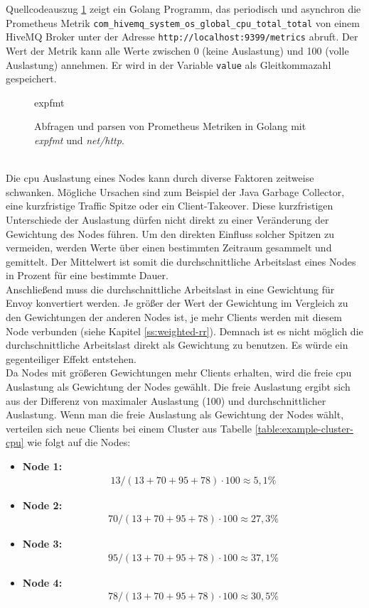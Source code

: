 Quellcodeauszug \ref{code:expfmt} zeigt ein Golang Programm, das periodisch und asynchron die Prometheus Metrik \verb|com_hivemq_system_os_global_cpu_total_total| von einem HiveMQ Broker unter der Adresse \verb|http://localhost:9399/metrics| abruft. Der Wert der Metrik kann alle Werte zwischen 0 (keine Auslastung) und 100 (volle Auslastung) annehmen. Er wird in der Variable \verb|value| als Gleitkommazahl gespeichert.
\begin{figure}
    {expfmt}
    \caption{Abfragen und parsen von Prometheus Metriken in Golang mit \textit{expfmt} und \textit{net/http}.}
    \label{code:expfmt}
\end{figure}
\\
Die \ac{cpu} Auslastung eines Nodes kann durch diverse Faktoren zeitweise schwanken. Mögliche Ursachen sind zum Beispiel der Java Garbage Collector, eine kurzfristige Traffic Spitze oder ein Client-Takeover.
Diese kurzfristigen Unterschiede der Auslastung dürfen nicht direkt zu einer Veränderung der Gewichtung des Nodes führen.
Um den direkten Einfluss solcher Spitzen zu vermeiden, werden Werte über einen bestimmten Zeitraum gesammelt und gemittelt. Der Mittelwert ist somit die durchschnittliche Arbeitslast eines Nodes in Prozent für eine bestimmte Dauer.
\\
Anschlie{\ss}end muss die durchschnittliche Arbeitslast in eine Gewichtung für Envoy konvertiert werden. Je grö{\ss}er der Wert der Gewichtung im Vergleich zu den Gewichtungen der anderen Nodes ist, je mehr Clients werden mit diesem Node verbunden (siehe Kapitel \ref{ss:weighted-rr}). Demnach ist es nicht möglich die durchschnittliche Arbeitslast direkt als Gewichtung zu benutzen. Es würde ein gegenteiliger Effekt entstehen.
\\
Da Nodes mit grö{\ss}eren Gewichtungen mehr Clients erhalten, wird die freie \ac{cpu} Auslastung als Gewichtung der Nodes gewählt.
Die freie Auslastung ergibt sich aus der Differenz von maximaler Auslastung (100) und durchschnittlicher Auslastung.
Wenn man die freie Auslastung als Gewichtung der Nodes wählt, verteilen sich neue Clients bei einem Cluster aus Tabelle \ref{table:example-cluster-cpu} wie folgt auf die Nodes:
\begin{itemize}
  \item \textbf{Node 1:}
    \begin{align}
      13 / (13 + 70 + 95 + 78) \cdot 100 \approx 5,1 \%
    \end{align}
  \item \textbf{Node 2:}
    \begin{align}
      70 / (13 + 70 + 95 + 78) \cdot 100 \approx 27,3 \%
    \end{align}
  \item \textbf{Node 3:}
    \begin{align}
      95 / (13 + 70 + 95 + 78) \cdot 100 \approx 37,1 \%
    \end{align}
  \item \textbf{Node 4:}
    \begin{align}
      78 / (13 + 70 + 95 + 78) \cdot 100 \approx 30,5 \%
    \end{align}
\end{itemize}
